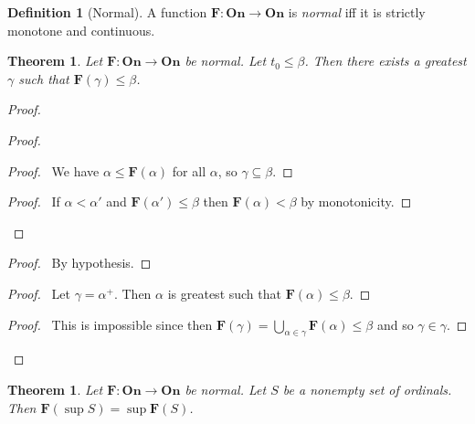 \documentclass{article}
\let\qed\relax
\newtheorem{theorem}[axiom]{Theorem}
\theoremstyle{definition}
\newtheorem{definition}[axiom]{Definition}
\begin{document}
    \begin{definition}[Normal]
        A function $\mathbf{F} : \mathbf{On} \rightarrow \mathbf{On}$ is \emph{normal} iff it is
        strictly monotone and continuous.
    \end{definition}

    \begin{theorem}
        Let $\mathbf{F} : \mathbf{On} \rightarrow \mathbf{On}$ be normal. Let $t_0 \leq \beta$.
        Then there exists a greatest $\gamma$ such that $\mathbf{F}(\gamma) \leq \beta$.
    \end{theorem}

    \begin{proof}
        \pf
            \begin{proof}
                \begin{proof}
                    \pf\ We have $\alpha \leq \mathbf{F}(\alpha)$ for all $\alpha$, so $\gamma \subseteq \beta$.
                \end{proof}
                \begin{proof}
                    \pf\ If $\alpha < \alpha'$ and $\mathbf{F}(\alpha') \leq \beta$ then $\mathbf{F}(\alpha) < \beta$
                    by monotonicity.
                \end{proof}
            \end{proof}
            \begin{proof}
                \pf\ By hypothesis.
            \end{proof}
        \begin{proof}
            \pf\ Let $\gamma = \alpha^+$. Then $\alpha$ is greatest such that $\mathbf{F}(\alpha) \leq \beta$.
        \end{proof}
        \begin{proof}
            \pf\ This is impossible since then $\mathbf{F}(\gamma) = \bigcup_{\alpha \in \gamma} \mathbf{F}(\alpha) \leq \beta$
            and so $\gamma \in \gamma$.
        \end{proof}
        \qed
    \end{proof}

    \begin{theorem}
        Let $\mathbf{F} : \mathbf{On} \rightarrow \mathbf{On}$ be normal. Let $S$ be a nonempty set of
        ordinals. Then $\mathbf{F}(\sup S) = \sup \mathbf{F}(S)$.
    \end{theorem}
\end{document}
